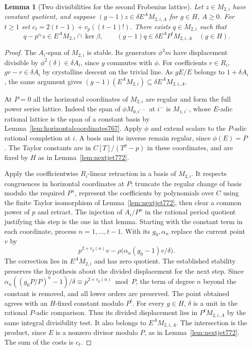 \documentclass[a4paper,11pt]{article}
\newtheorem{lemma}[proposition]{Lemma}
\theoremstyle{definition}
\theoremstyle{remark}
\numberwithin{equation}{section}
\begin{document}
\begin{lemma}[Two divisibilities for the second Frobenius lattice]
\leavevmode\label{lem:secondorders775}
Let \(z\in M_{2,i}\) have constant quotient, and suppose
\((g-1)z\in\delta E^A M_{2,i,A}\) for \(g\in H\), \(A\ge0\).
For \(t\ge1\) set \(c_t=2(t-1)+v_p((t-1)!)\).
There exists \(q\in M_{2,i}\) such that
\[
 q-p^{c_t}z\in E^A M_{2,i}\cap\ker\beta,\qquad
 (g-1)q\in\delta E^A P^t M_{2,i,A}\quad(g\in H).
\]
\end{lemma}
\begin{proof}
The \(A_i\)-span of \(M_{2,i}\) is stable. Its generators
\(\phi^2 m\) have displacement divisible by
\(\phi^2(\delta)\in\delta A_i\), since \(g\) commutes with
\(\phi\). For coefficients \(r\in R_i\), \(gr-r\in\delta A_i\)
by crystalline descent on the trivial line. As \(gE/E\)
belongs to \(1+\delta A_i\), the same argument gives
\((g-1)(E^A M_{2,i})\subseteq\delta E^A M_{2,i,A}\).

At \(P=0\) all the horizontal coordinates of \(M_{2,i}\)
are regular and form the full power series lattice.
Indeed the span of \(\phi M_{0,i^{--}}\) at \(i^-\)
is \(M_{1,i^-}\), whose \(E\)-adic rational lattice is
the span of a constant basis by
Lemma~\ref{lem:horizontalcoordinates767}. Apply \(\phi\)
and extend scalars to the \(P\)-adic rational completion
at \(i\). A basis and its inverse remain regular, since
\(\phi(E)=P\). The Taylor constants are in
\(C[T]/(T^p-p)\) in these coordinates, and are fixed by
\(H\) as in Lemma~\ref{lem:nextjet772}.

Apply the coefficientwise \(R_i\)-linear retraction in
a basis of \(M_{2,i}\). It respects congruences in
horizontal coordinates at \(P\): truncate the regular
change of basis modulo the required \(P^n\), represent
the coefficients by polynomials over \(C\) using the
finite Taylor isomorphism of Lemma~\ref{lem:nextjet772},
then clear a common power of \(p\) and retract. The
injection of \(A_i/P^n\) in the rational period quotient
justifying this step is the one in that lemma.
Starting with the constant term in each coordinate,
process \(n=1,\ldots,t-1\). With its \(g_0,\alpha_n\)
replace the current point \(v\) by
\[
 p^{2+v_p(n)}v-
      \rho\big(\alpha_n(g_0-1)v/\delta\big).
\]
The correction lies in \(E^A M_{2,i}\) and has zero quotient.
The established stability preserves the hypothesis about
the divided displacement for the next step. Since
\(\alpha_n((g_0P/P)^n-1)/\delta\equiv
p^{2+v_p(n)}\bmod P\), the term of degree \(n\) beyond
the constant is removed, and all lower orders are preserved.
The point obtained agrees with an \(H\)-fixed constant
modulo \(P^t\). For every \(g\in H\), \(\delta\) is a unit
in the rational \(P\)-adic comparison. Thus its divided
displacement lies in \(P^t M_{2,i,A}\) by the same
integral divisibility test. It also belongs to
\(E^A M_{2,i,A}\). The intersection is the product,
since \(E\) is a nonzero divisor modulo \(P\), as in
Lemma~\ref{lem:nextjet772}. The sum of the costs is \(c_t\).
\end{proof}
\end{document}
